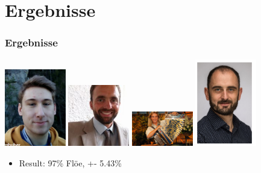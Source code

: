 \documentclass[ignorenonframetext,naustrian,12pt,t]{beamer}
\begin{document}
\section{Ergebnisse}
\begin{frame}
	\frametitle{Ergebnisse}
		 \includegraphics[width=0.2\textwidth]{Bergi.png} 		 \includegraphics[width=0.2\textwidth]{Eiben.jpg} 		 \includegraphics[width=0.2\textwidth]{Silbereisen.jpg} 		 \includegraphics[width=0.2\textwidth]{Starzer.png} 
		\begin{itemize}[label={\color{myTitleColour}\textbullet}]
		\item Result: 97\% Flöe, +- 5.43\%
		\end{itemize}
\end{frame}

\end{document}
